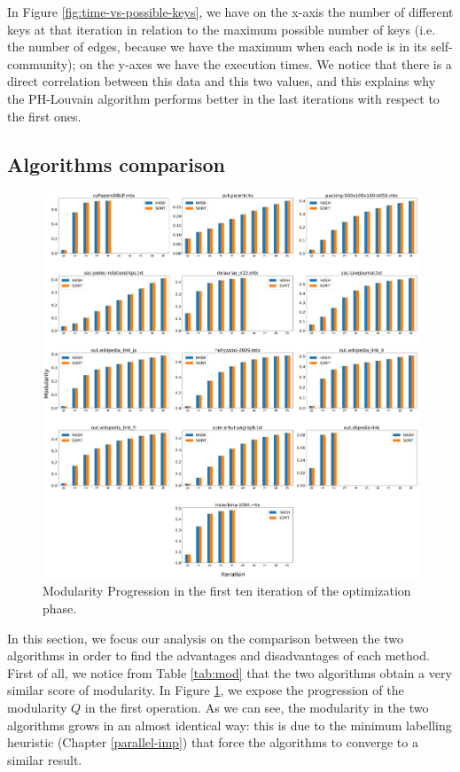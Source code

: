 \noindent In Figure \ref{fig:time-vs-possible-keys}, we have on the x-axis the number of different keys at that iteration in relation to the maximum possible number of keys (i.e. the number of edges, because we have the maximum when each node is in its self-community); on the y-axes we have the execution times. We notice that there is a direct correlation between this data and this two values, and this explains why the PH-Louvain algorithm performs better in the last iterations with respect to the first ones. 
\newpage
\subsection{Algorithms comparison}\label{alg-comp}
\begin{figure}[h]
	\centering
	\includegraphics[width=1\linewidth]{0-resources/modularity-progression}
	\caption{Modularity Progression in the first ten iteration of the optimization phase.}
	\label{fig:modularity-progression}
\end{figure} 
\noindent In this section, we focus our analysis on the comparison between the two algorithms in order to find the advantages and disadvantages of each method. 
First of all, we notice from Table \ref{tab:mod} that the two algorithms obtain a very similar score of modularity. In Figure \ref{fig:modularity-progression}, we expose the progression of the modularity $Q$ in the first operation. As we can see, the modularity in the two algorithms grows in an almost identical way: this is due to the minimum labelling heuristic (Chapter \ref{parallel-imp}) that force the algorithms to converge to a similar result. \\
